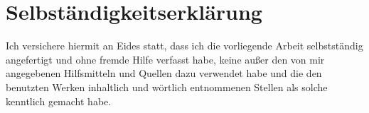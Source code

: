 







             

\newpage
\thispagestyle{empty}
\section*{Selbständigkeitserklärung}
Ich versichere hiermit an Eides statt, dass ich die vorliegende Arbeit
selbstständig angefertigt und ohne fremde Hilfe verfasst habe, keine außer den
von mir angegebenen Hilfsmitteln und Quellen dazu verwendet habe und die den
benutzten Werken inhaltlich und wörtlich entnommenen Stellen als solche
kenntlich gemacht habe. \vspace*{2cm}

\begin{flushright} \theLocationAndDate{} \end{flushright}
